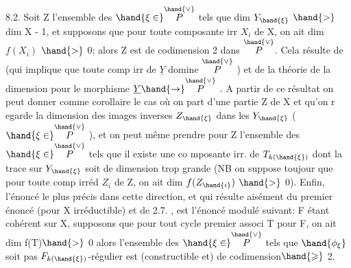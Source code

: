 
8.2. Soit Z l'ensemble des $\hand{\xi\in}\overset{\hand{\vee}}{P}$ tels que dim $Y_{\hand{\xi}}$ $\hand{>}$ dim X - 1,\hand{\unsure{\xi}}
et supposons que pour toute composante irr $X_i$ de X, on ait dim $f(X_i)$ $\hand{>}$ 0;
alors Z est de codimension 2 dans $\overset{\hand{\vee}}{P}$.  Cela
résulte de 
 (qui implique que toute comp irr de $\underline{Y}$ domine $\overset{\hand{\vee}}{P}$ ) et de
la théorie de la dimension pour le morphisme $\underline{Y} \hand{\to} \overset{\hand{\vee}}{P}$ . A partir de ce
résultat  on peut donner comme corollaire le cas où on
part d'une partie   Z de X et qu'on r egarde la dimension des
images inverses $Z_{\hand{\xi}}$ dans les $Y_{\hand{\xi}}$ ( $\hand{\xi\in}\overset{\hand{\vee}}{P}$ ), et on peut même prendre pour
Z l'ensemble des $\hand{\xi\in}\overset{\hand{\vee}}{P}$ tels que il existe une co mposante irr. de $T_{k(\hand{\xi})}$
dont la trace sur $Y_{\hand{\xi}}$ soit de dimension trop grande (NB on suppose toujour
que pour toute comp irréd $Z_i$ de Z, on ait dim $f(Z_{\hand{i}})$ $\hand{>}$ 0). Enfin, l'énoncé
le plus précis dans cette direction, et qui résulte aisément du premier
énoncé (pour X irréductible) et de 2.7. , est l'énoncé modulé suivant:
F étant cohérent sur X,  supposons que pour tout cycle premier associ
T pour F, on ait dim f(T)$\hand{>}$ 0\unsure{;|,} alors l'ensemble des $\hand{\xi\in}\overset{\hand{\vee}}{P}$ tels que
$\hand{\phi_\xi}$  soit pas $F_{k(\hand{\xi})}$-régulier est (constructible et) de codimension$\hand{\geqslant}$ 2.
